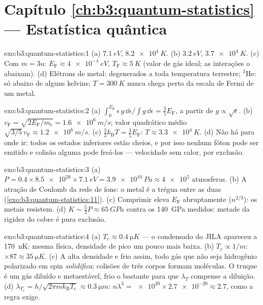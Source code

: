 \section*{Capítulo \ref{ch:b3:quantum-statistics} --- Estatística quântica}

\begin{solution}{exo:b3:quantum-statistics:1}
(a) $\qty{7.1}{eV}$, $\qty{8.2e4}{K}$. (b) $\qty{3.2}{eV}$,
$\qty{3.7e4}{K}$. (c) Com $m = 3u$: $E_{\text{F}} \approx
\qty{4e-4}{eV}$, $T_{\text{F}} \approx \qty{5}{K}$ (valor de gás
ideal; as interações o abaixam). (d) Elétrons de metal: degenerados a
toda temperatura terrestre; $^3$He: só abaixo de alguns kelvins;
$T = \qty{300}{K}$ nunca chega perto da escala de Fermi de um metal.
\end{solution}

\begin{solution}{exo:b3:quantum-statistics:2}
(a) $\int_0^{E_{\text{F}}}\epsilon\,g\,\dd\epsilon/\int g\,\dd
\epsilon = \tfrac35 E_{\text{F}}$, a partir de $g \propto \sqrt\epsilon$.
(b) $v_{\text{F}} = \sqrt{2E_{\text{F}}/m_{\text{e}}} =
\qty{1.6e6}{m/s}$; valor quadrático médio $\sqrt{3/5}\,v_{\text{F}} \approx
\qty{1.2e6}{m/s}$. (c) $\tfrac32 k_{\text{B}}T = \tfrac35
E_{\text{F}}$: $T \approx \qty{3.3e4}{K}$. (d) Não há para onde
ir: todos os estados inferiores estão cheios, e por isso nenhum fóton
pode ser emitido e colisão alguma pode freá-los --- velocidade sem
calor, por exclusão.
\end{solution}

\begin{solution}{exo:b3:quantum-statistics:3}
(a) $P = 0.4 \times \num{8.5e28} \times \qty{7.1}{eV} =
\qty{3.9e10}{Pa} \approx \num{4e5}$ atmosferas. (b) A atração de
Coulomb da rede de íons: o metal é a trégua entre as
duas (\cref{exo:b3:quantum-statistics:11}). (c) Comprimir eleva
$E_{\text{F}}$ abruptamente ($n^{2/3}$): os metais resistem. (d) $K \sim
\tfrac53 P \approx \qty{65}{GPa}$ contra os \qty{140}{GPa}
medidos: metade da rigidez do cobre é pura exclusão.
\end{solution}

\begin{solution}{exo:b3:quantum-statistics:4}
(a) $T_{\text{c}} \approx \qty{0.4}{\micro K}$ --- o condensado do
JILA apareceu a \qty{170}{nK}: mesma física, densidade de pico um pouco
mais baixa. (b) $T_{\text{c}} \propto 1/m$: $\times87 \approx
\qty{35}{\micro K}$. (c) A alta densidade e frio assim, todo gás que
não seja hidrogênio polarizado em spin \emph{solidifica}; colisões de
três corpos formam moléculas. O truque é um gás diluído e metaestável,
frio o bastante para que $\lambda_T$ compense a diluição. (d)
$\lambda_{T_{\text{c}}} = h/\sqrt{2\pi mk_{\text{B}}T_{\text{c}}}
\approx \qty{0.3}{\micro m}$: $n\lambda^3 = \num{e20} \times
\num{2.7e-20} \approx 2.7$, como a regra exige.
\end{solution}

